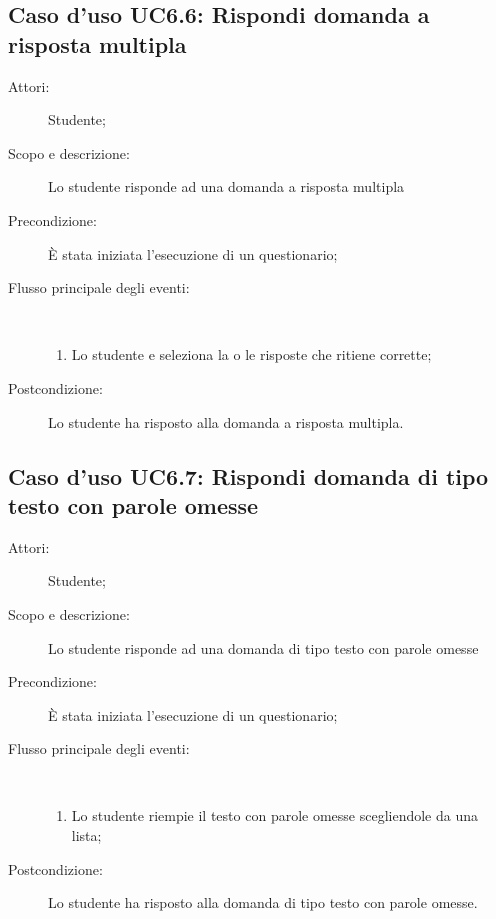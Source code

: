 \subsection{Caso d'uso UC6.6: Rispondi domanda a risposta multipla}\begin{description}
	\item[Attori:] Studente;
	\item[Scopo e descrizione:] Lo studente risponde ad una domanda a risposta multipla
	\item[Precondizione:] È stata iniziata l'esecuzione di un questionario;
	
	\item[Flusso principale degli eventi:] \ 
	\begin{enumerate}
		\item Lo studente e seleziona la o le risposte che ritiene corrette;
		
	\end{enumerate}
	\item[Postcondizione:] Lo studente ha risposto alla domanda a risposta multipla.
\end{description}
\hypertarget{UC6.7}{}
\subsection{Caso d'uso UC6.7: Rispondi domanda di tipo testo con parole omesse}\begin{description}
	\item[Attori:] Studente;
	\item[Scopo e descrizione:] Lo studente risponde ad una domanda di tipo testo con parole omesse
	\item[Precondizione:] È stata iniziata l'esecuzione di un questionario;
	
	\item[Flusso principale degli eventi:] \ 
	\begin{enumerate}
		\item Lo studente riempie il testo con parole omesse scegliendole da una lista;
		
	\end{enumerate}
	\item[Postcondizione:] Lo studente ha risposto alla domanda di tipo testo con parole omesse.
\end{description}
\hypertarget{UC6.8}{}
